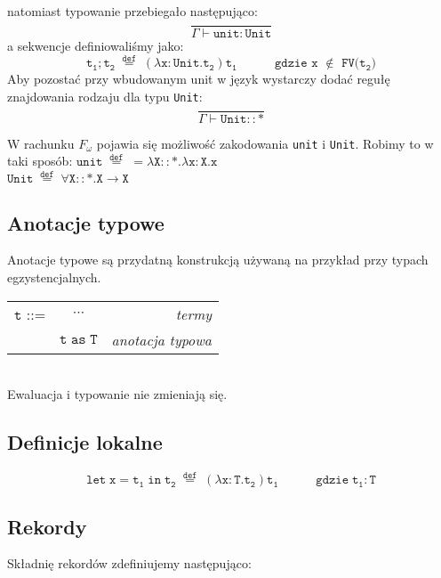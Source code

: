 \documentclass[11pt,leqno]{article}
\begin{document}
natomiast typowanie przebiegało następująco:~\[\mathtt{ \frac{}{\Gamma \vdash unit:Unit}
		}
	\]
a sekwencje definiowaliśmy jako:~\[\mathtt{ t_1;t_2 \;\overset{def}{=}\; (\lambda x:Unit.t_2)t_1 \hspace{3em} \text{gdzie x $\notin$ FV($t_2$)}
		}
	\]
Aby pozostać przy wbudowanym unit w język wystarczy dodać regułę znajdowania rodzaju dla typu \texttt{Unit}:~\[\mathtt{ \frac{}{\Gamma \vdash Unit::\ast}
		}
	\]

W rachunku $F_\omega$ pojawia się możliwość zakodowania \texttt{unit} i \texttt{Unit}. Robimy to w taki sposób:
$\mathtt{unit \;\overset{def}{=}\;= \lambda X::\ast.\lambda x:X.x}$ \\
$\mathtt{Unit \;\overset{def}{=}\; \forall X::\ast.X \rightarrow X}$ \\


\subsection{Anotacje typowe}

Anotacje typowe są przydatną konstrukcją używaną na przykład przy typach egzystencjalnych.\\
\begin{tabular}{| l c r |}
  \hline
  $\mathtt{t}$ ::= & $\cdots$ & \textit{termy}  \\
   & $\mathtt{t\;as\;T}$ &\textit{anotacja typowa} \\
  \hline
\end{tabular} \\

Ewaluacja i typowanie nie zmieniają się.

\subsection{Definicje lokalne}

 	\[\mathtt{let\;x=t_1\;in\;t_2 \;\overset{def}{=}\;(\lambda x:T.t_2)t_1 \hspace{3em}\text{gdzie}\; t_1:T 
		}
	\]

\subsection{Rekordy}

Składnię rekordów zdefiniujemy następująco:\\
\end{document}
